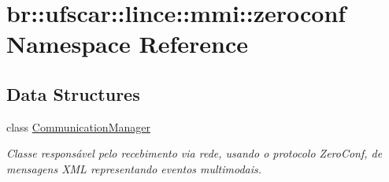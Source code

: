 \hypertarget{namespacebr_1_1ufscar_1_1lince_1_1mmi_1_1zeroconf}{
\section{br::ufscar::lince::mmi::zeroconf Namespace Reference}
\label{namespacebr_1_1ufscar_1_1lince_1_1mmi_1_1zeroconf}
}
\subsection*{Data Structures}
\begin{DoxyCompactItemize}
\item 
class \hyperlink{classbr_1_1ufscar_1_1lince_1_1mmi_1_1zeroconf_1_1CommunicationManager}{CommunicationManager}
\begin{DoxyCompactList}\small\item\em Classe responsável pelo recebimento via rede, usando o protocolo ZeroConf, de mensagens XML representando eventos multimodais. \item\end{DoxyCompactList}\end{DoxyCompactItemize}
